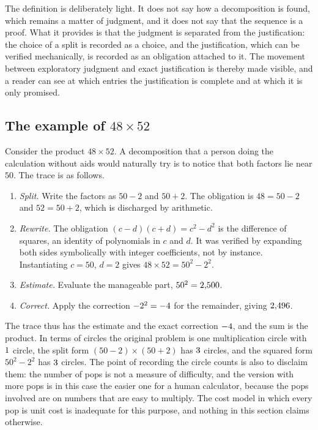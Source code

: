 The definition is deliberately light. It does not say how a decomposition is found, which remains a matter of judgment, and it does not say that the sequence is a proof. What it provides is that the judgment is separated from the justification: the choice of a split is recorded as a choice, and the justification, which can be verified mechanically, is recorded as an obligation attached to it. The movement between exploratory judgment and exact justification is thereby made visible, and a reader can see at which entries the justification is complete and at which it is only promised.

\subsection{The example of $48\times52$}

Consider the product $48\times52$. A decomposition that a person doing the calculation without aids would naturally try is to notice that both factors lie near $50$. The trace is as follows.

\begin{enumerate}[label=\textbf{\arabic*.}]
\item \emph{Split.} Write the factors as $50-2$ and $50+2$. The obligation is $48=50-2$ and $52=50+2$, which is discharged by arithmetic.
\item \emph{Rewrite.} The obligation $(c-d)(c+d)=c^2-d^2$ is the difference of squares, an identity of polynomials in $c$ and $d$. It was verified by expanding both sides symbolically with integer coefficients, not by instance. Instantiating $c=50$, $d=2$ gives $48\times52=50^2-2^2$.
\item \emph{Estimate.} Evaluate the manageable part, $50^2=2{,}500$.
\item \emph{Correct.} Apply the correction $-2^2={-}4$ for the remainder, giving $2{,}496$.
\end{enumerate}

The trace thus has the estimate \factDecompEstimate{} and the exact correction ${-}4$, and the sum is the product. In terms of circles the original problem is one multiplication circle with $1$ circle, the split form $(50-2)\times(50+2)$ has $3$ circles, and the squared form $50^2-2^2$ has $3$ circles. The point of recording the circle counts is also to disclaim them: the number of pops is not a measure of difficulty, and the version with more pops is in this case the easier one for a human calculator, because the pops involved are on numbers that are easy to multiply. The cost model in which every pop is unit cost is inadequate for this purpose, and nothing in this section claims otherwise.

